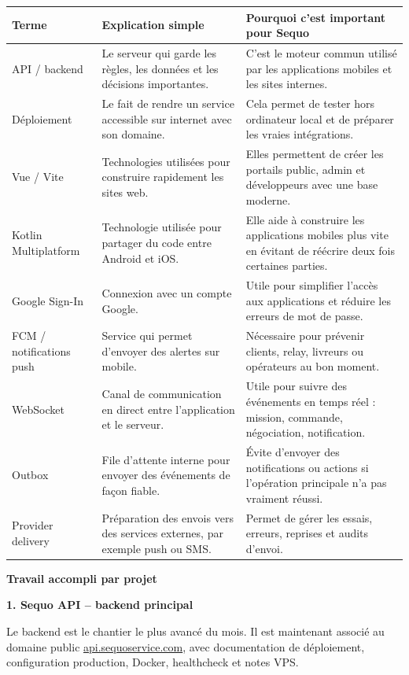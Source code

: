\documentclass[11pt,letterpaper]{article}
\newcommand{\sectiontitle}[1]{%
  \vspace{0.55em}
  {\Large\bfseries\color{SequoInk}#1}\par
  \vspace{0.1em}
}
\newcommand{\subsectiontitle}[1]{%
  \vspace{0.35em}
  {\large\bfseries\color{SequoInk}#1}\par
}
\begin{document}
{\small
\begin{tabularx}{\linewidth}{@{}L{3.4cm}Y Y@{}}
\toprule
{}
\textbf{Terme} & \textbf{Explication simple} & \textbf{Pourquoi c'est important pour Sequo} \\
\midrule
API / backend & Le serveur qui garde les règles, les données et les décisions importantes. & C'est le moteur commun utilisé par les applications mobiles et les sites internes. \\
Déploiement & Le fait de rendre un service accessible sur internet avec son domaine. & Cela permet de tester hors ordinateur local et de préparer les vraies intégrations. \\
Vue / Vite & Technologies utilisées pour construire rapidement les sites web. & Elles permettent de créer les portails public, admin et développeurs avec une base moderne. \\
Kotlin Multiplatform & Technologie utilisée pour partager du code entre Android et iOS. & Elle aide à construire les applications mobiles plus vite en évitant de réécrire deux fois certaines parties. \\
Google Sign-In & Connexion avec un compte Google. & Utile pour simplifier l'accès aux applications et réduire les erreurs de mot de passe. \\
FCM / notifications push & Service qui permet d'envoyer des alertes sur mobile. & Nécessaire pour prévenir clients, relay, livreurs ou opérateurs au bon moment. \\
WebSocket & Canal de communication en direct entre l'application et le serveur. & Utile pour suivre des événements en temps réel : mission, commande, négociation, notification. \\
Outbox & File d'attente interne pour envoyer des événements de façon fiable. & Évite d'envoyer des notifications ou actions si l'opération principale n'a pas vraiment réussi. \\
Provider delivery & Préparation des envois vers des services externes, par exemple push ou SMS. & Permet de gérer les essais, erreurs, reprises et audits d'envoi. \\
\bottomrule
\end{tabularx}
}

\newpage
\sectiontitle{Travail accompli par projet}

\subsectiontitle{1. Sequo API -- backend principal}
Le backend est le chantier le plus avancé du mois. Il est maintenant associé au domaine public \href{https://api.sequoservice.com}{api.sequoservice.com}, avec documentation de déploiement, configuration production, Docker, healthcheck et notes VPS.
\end{document}
